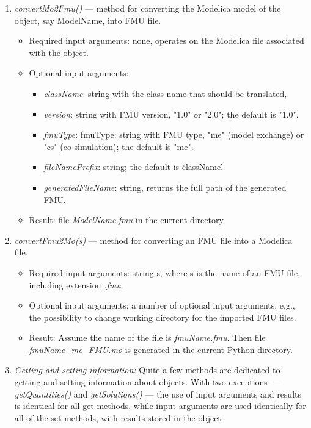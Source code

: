 \begin{enumerate}
	\item \textit{convertMo2Fmu()} — method for converting the Modelica model of the object, say ModelName, into FMU file.
	\begin{itemize}
		\item Required input arguments: none, operates on the Modelica file associated with the object.
		\item Optional input arguments:
		\begin{itemize}
			\item \textit{className}: string with the class name that should be translated,
			\item \textit{version}: string with FMU version, "1.0" or "2.0"; the default is "1.0".
			\item \textit{fmuType}: fmuType: string with FMU type, "me" (model exchange) or "cs" (co-simulation); the default is "me".
			\item \textit{fileNamePrefix}: string; the default is \'className\'.
			\item \textit{generatedFileName}: string, returns the full path of the generated FMU.
		\end{itemize}
		\item Result: file \textit{ModelName.fmu} in the current directory
	\end{itemize}
	\item \textit{convertFmu2Mo(s)} — method for converting an FMU file into a Modelica file.
	\begin{itemize}
		\item Required input arguments: string s, where s is the name of an FMU file, including extension \textit{.fmu}.
        \item Optional input arguments: a number of optional input arguments, e.g., the possibility to change working directory for the imported FMU files.
        \item Result: Assume the name of the file is \textit{fmuName.fmu}. Then file \textit{fmuName\_me\_FMU.mo} is generated in the current Python  
        	  directory.
	\end{itemize}
	\item \textit{Getting and setting information:} Quite a few methods are dedicated to getting and setting information about
	objects. With two exceptions — \textit{getQuantities()} and \textit{getSolutions()} — the use of input arguments and results is identical for all get methods, while input arguments are used identically for all of the set methods, with results	stored in the object.
	

\end{enumerate}
